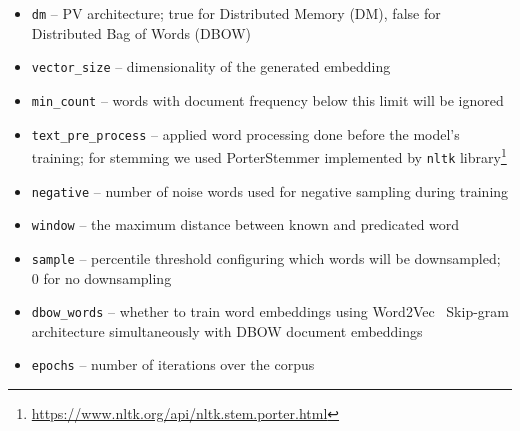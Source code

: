\begin{itemize}

  \item \texttt{dm} --  PV architecture; true for Distributed Memory (DM),
    false for Distributed Bag of Words (DBOW)

  \item \texttt{vector\_size} -- dimensionality of the generated embedding

  \item \texttt{min\_count} -- words with document frequency below this limit
    will be ignored

  \item \texttt{text\_pre\_process} -- applied word processing done before the
    model's training; for stemming we used PorterStemmer implemented by
    \texttt{nltk}
    library\footnote{\url{https://www.nltk.org/api/nltk.stem.porter.html}}

  \item \texttt{negative} -- number of noise words used for negative sampling
    during training

  \item \texttt{window} -- the maximum distance between known and predicated
    word

  \item \texttt{sample} -- percentile threshold configuring which words will be
    downsampled; 0 for no downsampling


  \item \texttt{dbow\_words} -- whether to train word embeddings using
    Word2Vec~\citep{mikolov2013efficient} Skip-gram architecture simultaneously
    with DBOW document embeddings

  \item \texttt{epochs} -- number of iterations over the corpus

\end{itemize}



